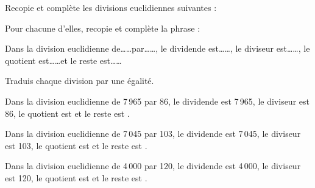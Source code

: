 \begin{myenumerate}
\item Recopie et complète les divisions euclidiennes suivantes :
\\\hfill
{}\hfill
{}
\item Pour chacune d'elles, recopie et complète la phrase :
\par
\begin{cursive}
Dans la division euclidienne de\ldots\ldots par\ldots\ldots, le
dividende est\ldots\ldots, le diviseur est\ldots\ldots, le quotient
est\ldots\ldots et le reste est\ldots\ldots
\end{cursive}
\item Traduis chaque division par une égalité.
\end{myenumerate}
\begin{myenumerate}
  \item\subitem{}\par
{}\hfill{}\hfill{}
\item \subitem{}\par
\begin{cursive}
Dans la division euclidienne de 7\,965 par 86, le
dividende est 7\,965, le diviseur est 86, le quotient
est  et le reste est .
\end{cursive}
\par
\begin{cursive}
Dans la division euclidienne de 7\,045 par 103, le
dividende est 7\,045, le diviseur est 103, le quotient
est  et le reste est .
\end{cursive}
\par
\begin{cursive}
Dans la division euclidienne de 4\,000 par 120, le
dividende est 4\,000, le diviseur est 120, le quotient
est  et le reste est .
\end{cursive}
\item \subitem{}\par
{}\hfill{}\hfill{}
\end{myenumerate}
